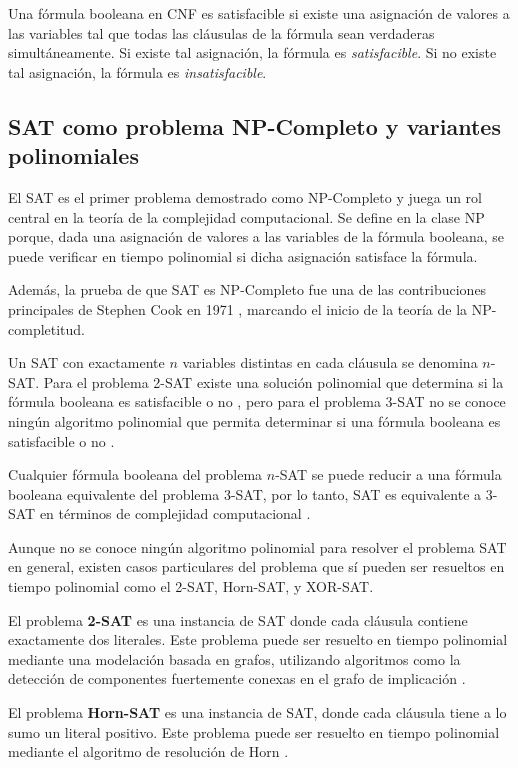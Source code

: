 \documentclass[12pt]{article}
\begin{document}
Una fórmula booleana en CNF es satisfacible si existe una asignación de valores a las variables tal que todas las cláusulas de la fórmula sean verdaderas simultáneamente.
Si existe tal asignación, la fórmula es \textit{satisfacible}. Si no existe tal asignación, la fórmula es \textit{insatisfacible}.

\subsection{SAT como problema NP-Completo y variantes polinomiales}

El SAT es el primer problema demostrado como NP-Completo \cite{authomataTheory} y juega un rol central en la teoría de la complejidad computacional. Se define en la clase NP porque, dada una asignación de valores a las variables de la fórmula booleana, se puede verificar en tiempo polinomial si dicha asignación satisface la fórmula.

Además, la prueba de que SAT es NP-Completo fue una de las contribuciones principales de Stephen Cook en 1971 \cite{Cook1971}, marcando el inicio de la teoría de la NP-completitud.

Un SAT con exactamente $n$ variables distintas en cada cláusula se denomina $n$-SAT. Para el problema 2-SAT existe una solución polinomial que determina si la fórmula booleana es satisfacible o no \cite{2satbib}, pero para el problema 3-SAT no se conoce ningún algoritmo polinomial que permita
determinar si una fórmula booleana es satisfacible o no \cite{authomataTheory}.

Cualquier fórmula booleana del problema $n$-SAT se puede reducir a una fórmula booleana equivalente del problema 3-SAT,
por lo tanto, SAT es equivalente a 3-SAT en términos de complejidad computacional \cite{authomataTheory}.

Aunque no se conoce ningún algoritmo polinomial para resolver el problema SAT en general,
existen casos particulares del problema que sí pueden ser resueltos en tiempo polinomial como el 2-SAT, Horn-SAT, y XOR-SAT.


El problema \textbf{2-SAT} es una instancia de SAT donde cada cláusula contiene exactamente dos literales.  Este problema puede ser resuelto en tiempo polinomial mediante una modelación basada en grafos, utilizando algoritmos como la detección de componentes fuertemente conexas en el grafo de implicación \cite{2satbib}.

El problema \textbf{Horn-SAT} es una instancia de SAT, donde cada cláusula tiene a lo sumo un literal positivo.  Este problema puede ser resuelto en tiempo polinomial mediante el algoritmo de resolución de Horn \cite{hornsatbib}.
\end{document}
